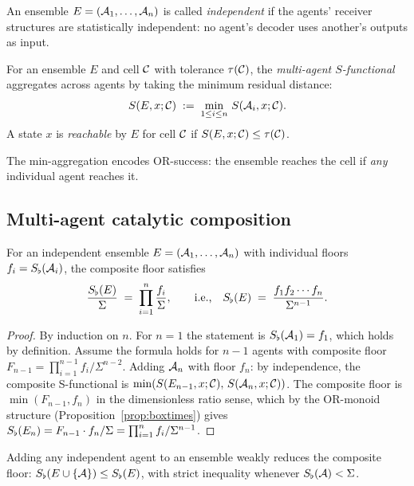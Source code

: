 An ensemble $E=(\mathcal{A}_1,\dots,\mathcal{A}_n)$ is called \emph{independent} if
the agents' receiver structures are statistically independent: no agent's
decoder uses another's outputs as input.

\begin{definition}\label{def:multi-S}
For an ensemble $E$ and cell $\mathcal{C}$ with tolerance $\tau(\mathcal{C})$, the
\emph{multi-agent $S$-functional} aggregates across agents by taking the
minimum residual distance:
\[
S(E,x;\mathcal{C}) \;:=\; \min_{1\le i\le n}\, S(\mathcal{A}_i,x;\mathcal{C}).
\]
A state $x$ is \emph{reachable} by $E$ for cell $\mathcal{C}$ if
$S(E,x;\mathcal{C})\le\tau(\mathcal{C})$.
\end{definition}

The min-aggregation encodes OR-success: the ensemble reaches the cell if
\emph{any} individual agent reaches it.

\subsection{Multi-agent catalytic composition}

\begin{theorem}\label{thm:multi-cat}
For an independent ensemble $E=(\mathcal{A}_1,\dots,\mathcal{A}_n)$ with individual
floors $f_i=S_{\flat}(\mathcal{A}_i)$, the composite floor satisfies
\[
\frac{S_{\flat}(E)}{\Sigma}
  \;=\; \prod_{i=1}^{n}\frac{f_i}{\Sigma},
\qquad\text{i.e.,}\quad
S_{\flat}(E) \;=\; \frac{f_1 f_2\cdots f_n}{\Sigma^{n-1}}.
\]
\end{theorem}

\begin{proof}
By induction on $n$. For $n=1$ the statement is $S_{\flat}(\mathcal{A}_1)=f_1$,
which holds by definition. Assume the formula holds for $n-1$ agents with
composite floor $F_{n-1}=\prod_{i=1}^{n-1}f_i/\Sigma^{n-2}$. Adding
$\mathcal{A}_n$ with floor $f_n$: by independence, the composite S-functional
is $\min(S(E_{n-1},x;\mathcal{C}),\,S(\mathcal{A}_n,x;\mathcal{C}))$. The composite
floor is $\min(F_{n-1},f_n)$ in the dimensionless ratio sense, which by the
OR-monoid structure (Proposition~\ref{prop:boxtimes}) gives
$S_{\flat}(E_n)=F_{n-1}\cdot f_n/\Sigma=\prod_{i=1}^n f_i/\Sigma^{n-1}$.
\end{proof}

\begin{corollary}\label{cor:monotone}
Adding any independent agent to an ensemble weakly reduces the composite
floor:
$S_{\flat}(E\cup\{\mathcal{A}\})\le S_{\flat}(E)$, with strict inequality whenever
$S_{\flat}(\mathcal{A})<\Sigma$.
\end{corollary}

